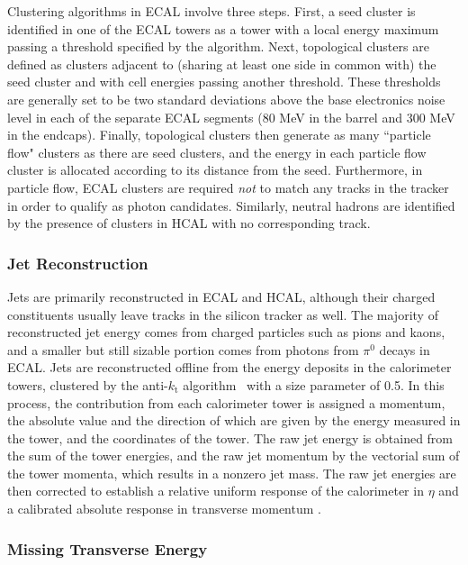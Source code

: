 Clustering algorithms in ECAL involve three steps. First, a seed cluster is identified in one of the ECAL towers as a tower with a local energy maximum passing a threshold specified by the algorithm. Next, topological clusters are defined as clusters adjacent to (sharing at least one side in common with) the seed cluster and with cell energies passing another threshold. These thresholds are generally set to be two standard deviations above the base electronics noise level in each of the separate ECAL segments (80 MeV in the barrel and 300 MeV in the endcaps). Finally, topological clusters then generate as many ``particle flow" clusters as there are seed clusters, and the energy in each particle flow cluster is allocated according to its distance from the seed. Furthermore, in particle flow, ECAL clusters are required \emph{not} to match any tracks in the tracker in order to qualify as photon candidates. Similarly, neutral hadrons are identified by the presence of clusters in HCAL with no corresponding track.


\subsubsection{Jet Reconstruction}

Jets are primarily reconstructed in ECAL and HCAL, although their charged constituents usually leave tracks in the silicon tracker as well. The majority of reconstructed jet energy comes from charged particles such as pions and kaons, and a smaller but still sizable portion comes from photons from $\pi^0$ decays in ECAL. Jets are reconstructed offline from the energy deposits in the calorimeter towers, clustered by the anti-$k_\mathrm{t}$ algorithm~\cite{Cacciari:2008gp, Cacciari:2011ma} with a size parameter of 0.5. In this process, the contribution from each calorimeter tower is assigned a momentum, the absolute value and the direction of which are given by the energy measured in the tower, and the coordinates of the tower. The raw jet energy is obtained from the sum of the tower energies, and the raw jet momentum by the vectorial sum of the tower momenta, which results in a nonzero jet mass. The raw jet energies are then corrected to establish a relative uniform response of the calorimeter in $\eta$ and a calibrated absolute response in transverse momentum \pt.

\subsubsection{Missing Transverse Energy}

